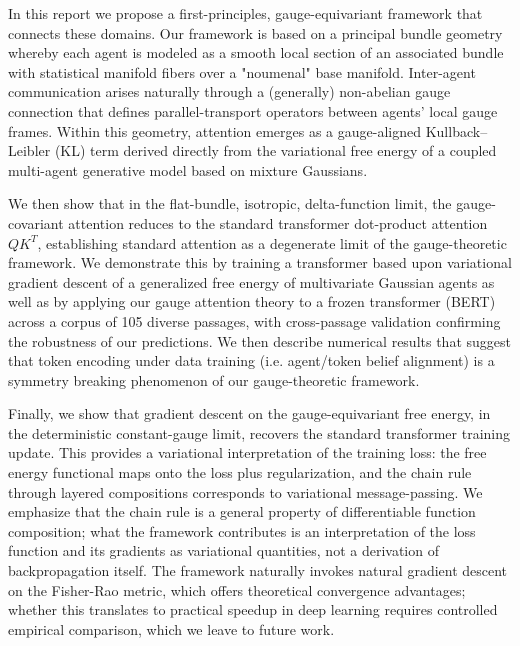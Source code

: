\documentclass[twoside,11pt]{article}
\begin{document}
In this report we propose a first-principles, gauge-equivariant framework that connects these domains. Our framework is based on a principal bundle geometry whereby each agent is modeled as a smooth local section of an associated bundle with statistical manifold fibers over a "noumenal" base manifold. Inter-agent communication arises naturally through a (generally) non-abelian gauge connection that defines parallel-transport operators between agents' local gauge frames. Within this geometry, attention emerges as a gauge-aligned Kullback–Leibler (KL) term derived directly from the variational free energy of a coupled multi-agent generative model based on mixture Gaussians.

We then show that in the flat-bundle, isotropic, delta-function limit, the gauge-covariant attention reduces to the standard transformer dot-product attention $QK^T$, establishing standard attention as a degenerate limit of the gauge-theoretic framework.  We demonstrate this by training a transformer based upon variational gradient descent of a generalized free energy of multivariate Gaussian agents as well as by applying our gauge attention theory to a frozen transformer (BERT) across a corpus of 105 diverse passages, with cross-passage validation confirming the robustness of our predictions.  We then describe numerical results that suggest that token encoding under data training (i.e. agent/token belief alignment) is a symmetry breaking phenomenon of our gauge-theoretic framework.

Finally, we show that gradient descent on the gauge-equivariant free energy, in the deterministic constant-gauge limit, recovers the standard transformer training update. This provides a variational interpretation of the training loss: the free energy functional maps onto the loss plus regularization, and the chain rule through layered compositions corresponds to variational message-passing. We emphasize that the chain rule is a general property of differentiable function composition; what the framework contributes is an interpretation of the loss function and its gradients as variational quantities, not a derivation of backpropagation itself. The framework naturally invokes natural gradient descent on the Fisher-Rao metric, which offers theoretical convergence advantages; whether this translates to practical speedup in deep learning requires controlled empirical comparison, which we leave to future work.
\end{document}
